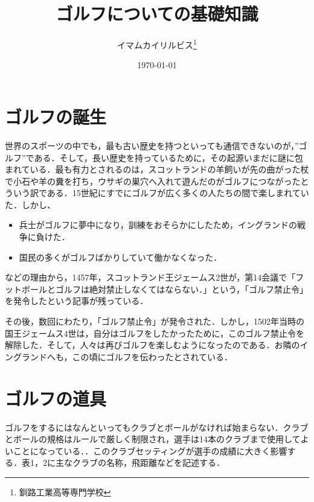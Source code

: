 \documentclass[a4j, twocolumn]{jarticle}
\begin{document}
\title{ゴルフについての基礎知識}
\author{イマムカイリルビス\thanks{釧路工業高等専門学校}}
\date{\today}

\maketitle

\section{ゴルフの誕生}

世界のスポーツの中でも，最も古い歴史を持つといっても通信できないのが，”ゴルフ”である．そして，長い歴史を持っているために，その起源いまだに謎に包まれている．最も有力とされるのは，スコットランドの羊飼いが先の曲がった杖で小石や羊の糞を打ち，ウサギの巣穴へ入れて遊んだのがゴルフにつながったとういう訳である．15世紀にすでにゴルフが広く多くの人たちの間で楽しまれていた．しかし、
\begin{itemize}
    \item 兵士がゴルフに夢中になり，訓練をおそらかにしたため，イングランドの戦争に負けた．
    \item 国民の多くがゴルフばかりしていて働かなくなった．
\end{itemize}
などの理由から，1457年，スコットランド王ジェームス2世が，第14会議で「フットボールとゴルフは絶対禁止しなくてはならない．」という，「ゴルフ禁止令」を発令したという記事が残っている．\cite{bib1}\\

\vspace{-15pt}

その後，数回にわたり，「ゴルフ禁止令」が発令された．しかし，1502年当時の国王ジェームス4世は，自分はゴルフをしたかったために，このゴルフ禁止令を解除した．そして，人々は再びゴルフを楽しむようになったのである．お隣のイングランドへも，この頃にゴルフを伝わったとされている．\cite{bib1}\\

\section{ゴルフの道具}

ゴルフをするにはなんといってもクラブとボールがなければ始まらない．クラブとボールの規格はルールで厳しく制限され，選手は14本のクラブまで使用してよいことになっている．\cite{bib2}．このクラブセッティングが選手の成績に大きく影響する．表1，2に主なクラブの名称，飛距離などを記述する．
\end{document}
